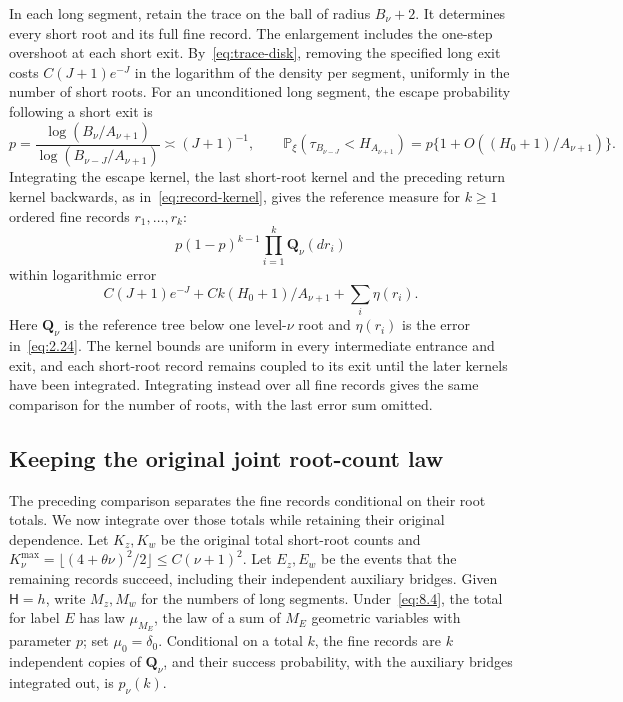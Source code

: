\documentclass[11pt,letterpaper,reqno]{amsart}
\numberwithin{equation}{section}
\theoremstyle{remark}
\begin{document}
In each long segment, retain the trace on the ball of radius $B_\nu+2$. It determines every short root and its full fine record. The enlargement includes the one-step overshoot at each short exit. By~\eqref{eq:trace-disk}, removing the specified long exit costs $C(J+1)e^{-J}$ in the logarithm of the density per segment, uniformly in the number of short roots. For an unconditioned long segment, the escape probability following a short exit is
\begin{equation}\label{eq:8.1}
 p=\frac{\log(B_\nu/A_{\nu+1})}{\log(B_{\nu-J}/A_{\nu+1})}
 \asymp(J+1)^{-1},\qquad
 \mathbb P_\xi(\tau_{B_{\nu-J}}<H_{A_{\nu+1}})
 =p\{1+O((H_0+1)/A_{\nu+1})\}.
\end{equation}
Integrating the escape kernel, the last short-root kernel and the preceding return kernel backwards, as in~\eqref{eq:record-kernel}, gives the reference measure for $k\ge1$ ordered fine records $r_1,\ldots,r_k$:
\begin{equation}\label{eq:8.4}
 p(1-p)^{k-1}\prod_{i=1}^k\mathbf Q_\nu(dr_i)
\end{equation}
within logarithmic error
\[
 C(J+1)e^{-J}+Ck(H_0+1)/A_{\nu+1}+\sum_i\eta(r_i).
\]
Here $\mathbf Q_\nu$ is the reference tree below one level-$\nu$ root and $\eta(r_i)$ is the error in~\eqref{eq:2.24}. The kernel bounds are uniform in every intermediate entrance and exit, and each short-root record remains coupled to its exit until the later kernels have been integrated. Integrating instead over all fine records gives the same comparison for the number of roots, with the last error sum omitted.

\subsection{Keeping the original joint root-count law}\label{sec:jointroots}
The preceding comparison separates the fine records conditional on their root totals. We now integrate over those totals while retaining their original dependence. Let $K_z,K_w$ be the original total short-root counts and
$K_\nu^{\max}=\lfloor(4+\theta\nu)^2/2\rfloor\le C(\nu+1)^2$.
Let $E_z,E_w$ be the events that the remaining records succeed, including their independent auxiliary bridges. Given $\mathsf H=h$, write $M_z,M_w$ for the numbers of long segments. Under~\eqref{eq:8.4}, the total for label $E$ has law $\mu_{M_E}$, the law of a sum of $M_E$ geometric variables with parameter $p$; set $\mu_0=\delta_0$. Conditional on a total $k$, the fine records are $k$ independent copies of $\mathbf Q_\nu$, and their success probability, with the auxiliary bridges integrated out, is $p_\nu(k)$.
\end{document}
